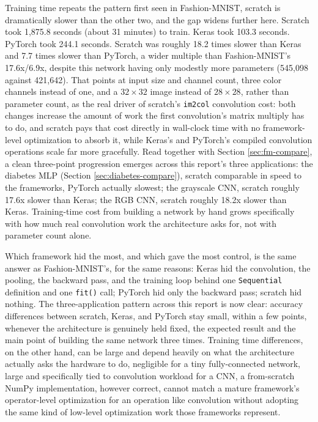 \documentclass[11pt]{article}
\newcommand{\code}[1]{\texttt{#1}}
\begin{document}
Training time repeats the pattern first seen in Fashion-MNIST, scratch is
dramatically slower than the other two, and the gap widens further here.
Scratch took 1,875.8 seconds (about 31 minutes) to train. Keras took 103.3
seconds. PyTorch took 244.1 seconds. Scratch was roughly 18.2 times slower
than Keras and 7.7 times slower than PyTorch, a wider multiple than
Fashion-MNIST's 17.6x/6.9x, despite this network having only modestly more
parameters (545,098 against 421,642). That points at input size and channel
count, three color channels instead of one, and a $32\times32$ image instead
of $28\times28$, rather than parameter count, as the real driver of scratch's
\code{im2col} convolution cost: both changes increase the amount of work the
first convolution's matrix multiply has to do, and scratch pays that cost
directly in wall-clock time with no framework-level optimization to absorb
it, while Keras's and PyTorch's compiled convolution operations scale far
more gracefully. Read together with Section \ref{sec:fm-compare}, a clean
three-point progression emerges across this report's three applications: the
diabetes MLP (Section \ref{sec:diabetes-compare}), scratch comparable in
speed to the frameworks, PyTorch actually slowest; the grayscale CNN, scratch
roughly 17.6x slower than Keras; the RGB CNN, scratch roughly 18.2x slower
than Keras. Training-time cost from building a network by hand grows
specifically with how much real convolution work the architecture asks for,
not with parameter count alone.

Which framework hid the most, and which gave the most control, is the same
answer as Fashion-MNIST's, for the same reasons: Keras hid the convolution,
the pooling, the backward pass, and the training loop behind one
\code{Sequential} definition and one \code{fit()} call; PyTorch hid only the
backward pass; scratch hid nothing. The three-application pattern across this
report is now clear: accuracy differences between scratch, Keras, and PyTorch
stay small, within a few points, whenever the architecture is genuinely held
fixed, the expected result and the main point of building the same network
three times. Training time differences, on the other hand, can be large and
depend heavily on what the architecture actually asks the hardware to do,
negligible for a tiny fully-connected network, large and specifically tied to
convolution workload for a CNN, a from-scratch NumPy implementation, however
correct, cannot match a mature framework's operator-level optimization for an
operation like convolution without adopting the same kind of low-level
optimization work those frameworks represent.
\end{document}
